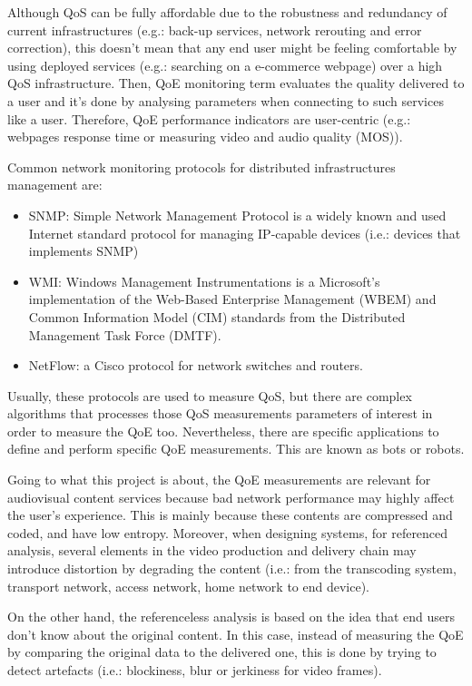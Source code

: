 Although QoS can be fully affordable due to the robustness and redundancy of current infrastructures (e.g.: back-up services, network rerouting and error correction), this doesn't mean that any end user might be feeling comfortable by using deployed services (e.g.: searching on a e-commerce webpage) over a high QoS infrastructure. Then, QoE monitoring term evaluates the quality delivered to a user and it's done by analysing parameters when connecting to such services like a user. Therefore, QoE performance indicators are user-centric (e.g.: webpages response time or measuring video and audio quality (MOS)).

Common network monitoring protocols for distributed infrastructures management are:

\begin{itemize}
\item SNMP: Simple Network Management Protocol is a widely known and used Internet standard protocol for managing IP-capable devices (i.e.: devices that implements SNMP)
\item WMI: Windows Management Instrumentations is a Microsoft's implementation of the Web-Based Enterprise Management (WBEM) and Common Information Model (CIM) standards from the Distributed Management Task Force (DMTF).
\item NetFlow: a Cisco protocol for network switches and routers.
\end{itemize}  

Usually, these protocols are used to measure QoS, but there are complex algorithms that processes those QoS measurements parameters of interest in order to measure the QoE too. Nevertheless, there are specific applications to define and perform specific QoE measurements. This are known as bots or robots.

Going to what this project is about, the QoE measurements are relevant for audiovisual content services because bad network performance may highly affect the user's experience. This is mainly because these contents are compressed and coded, and have low entropy. Moreover, when designing systems, for referenced analysis, several elements in the video production and delivery chain may introduce distortion by degrading the content (i.e.: from the transcoding system, transport network, access network, home network to end device).

On the other hand, the referenceless analysis is based on the idea that end users don't know about the original content. In this case, instead of measuring the QoE by comparing the original data to the delivered one, this is done by trying to detect artefacts (i.e.: blockiness, blur or jerkiness for video frames).

